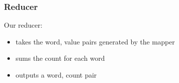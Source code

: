 \begin{Shaded}
\begin{Highlighting}[]
 
 

 
    \NormalTok{(}\NormalTok{)}
     
         
              \NormalTok{+ }

\end{Highlighting}
\end{Shaded}

\subsubsection{Reducer}\label{reducer}

Our reducer:

\begin{itemize}
\itemsep1pt\parskip0pt
\item
  takes the word, value pairs generated by the mapper
\item
  sums the count for each word
\item
  outputs a word, count pair
\end{itemize}

